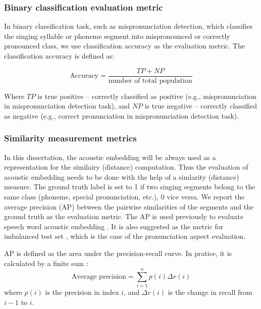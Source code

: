 \subsubsection{Binary classification evaluation metric}\label{sec:ch2:binary_classification_metric}

In binary classification task, such as mispronunciation detection, which classifies the singing syllable or phoneme segment into mispronounced or correctly pronounced class, we use classification accuracy as the evaluation metric. The classification accuracy is defined as:

\begin{equation}
\textrm{Accuracy} = \frac{TP + NP}{\textrm{number of total population}}
\end{equation}

Where $TP$ is true positive -- correctly classified as positive (e.g., mispronunciation in mispronunciation detection task), and $NP$ is true negative -- correctly classified as negative (e.g., correct pronunciation in mispronunciation detection task). 

\subsubsection{Similarity measurement metrics}

In this dissertation, the acoustic embedding will be always used as a representation for the similairy (distance) computation. Thus the evaluation of acoustic embedding needs to be done with the help of a simlarity (distance) measure. The ground truth label is set to 1 if two singing segments belong to the same class (phoneme, special pronunciation, etc.), 0 vice versa. We report the average precision (AP) between the pairwise similarities of the segments and the ground truth as the evaluation metric. The AP is used previously to evaluate speech word acoustic embedding \cite{Kampera,Settle2016a}. It is also suggested as the metric for imbalanced test set \cite{Davis2006}, which is the case of the pronunciation aspect evaluation.

AP is defined as the area under the precision-recall curve. In pratice, it is calculated by a finite sum :
\begin{equation}
\textrm{Average precision} = \sum_{i=1}^{n} p(i)\Delta r(i)
\end{equation} 
where $p(i)$ is the precision in index $i$, and  $\Delta r(i)$ is the change in recall from $i-1$ to $i$.

